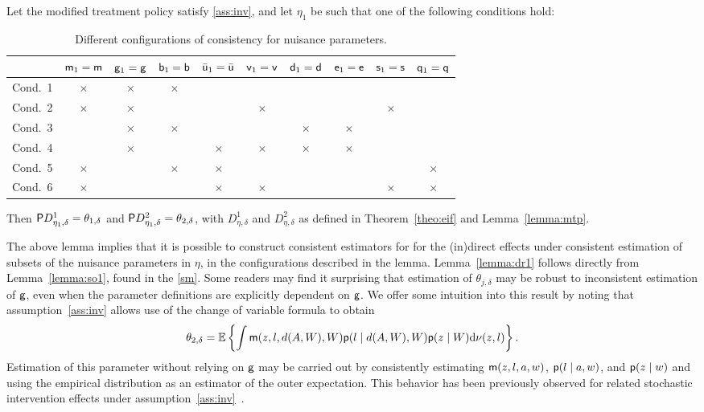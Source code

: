 \begin{lemma}\label{lemma:dr1}
  Let the modified treatment policy satisfy \ref{ass:inv}, and let $\eta_1$ be
  such that one of the following conditions hold:
  \begin{table}[H]
    \centering
    \begin{tabular}{|c|c|c|c|c|c|c|c|c|c|}\hline
              & $\m_1=\m$ & $\g_1=\g$ & $\b_1=\b$ & $\bar\uu_1=\bar\uu$ & $\vv_1=\vv$ & $\d_1=\d$ & $\e_1=\e$ & $\s_1=\s$ & $\q_1=\q$ \\\hline
      Cond.~1 & $\times$  & $\times$  & $\times$  &                     &             &           &           &           &           \\
      Cond.~2 & $\times$  & $\times$  &           &                     & $\times$    &           &           & $\times$  &           \\
      Cond.~3 &           & $\times$  & $\times$  &                     &             & $\times$  & $\times$  &           &           \\
      Cond.~4 &           & $\times$  &           & $\times$            & $\times$    & $\times$  & $\times$  &           &           \\
      Cond.~5 & $\times$  &           & $\times$  & $\times$            &             &           &           &           & $\times$  \\
      Cond.~6 & $\times$  &           &           & $\times$            & $\times$    &           &           & $\times$  & $\times$  \\\hline
    \end{tabular}
    \caption{Different configurations of consistency for nuisance
      parameters.}
    \label{tab:dr1}
  \end{table}
  Then $\P D_{\eta_1,\delta}^1=\theta_{1,\delta}$ and $\P
  D_{\eta_1,\delta}^2=\theta_{2,\delta}$, with $D_{\eta,\delta}^1$ and
  $D_{\eta,\delta}^2$ as defined in Theorem~\ref{theo:eif} and
  Lemma~\ref{lemma:mtp}.
\end{lemma}
The above lemma implies that it is possible to construct consistent estimators
for for the (in)direct effects under consistent estimation of subsets of the
nuisance parameters in $\eta$, in the configurations described in the lemma.
Lemma~\ref{lemma:dr1} follows directly from Lemma~\ref{lemma:so1}, found in
the \ref{sm}. Some readers may find it surprising that estimation of
$\theta_{j,\delta}$ may be robust to inconsistent estimation of $\g$, even when
the parameter definitions are explicitly dependent on $\g$. We offer some
intuition into this result by noting that assumption~\ref{ass:inv} allows use of
the change of variable formula to obtain $$\theta_{2,\delta} = \E\left\{\int
\m(z, l, d(A,W),W)\p(l\mid d(A,W), W)\p(z \mid W)\dd\nu(z,l)\right\}.$$
Estimation of this parameter without relying on $\g$ may be carried out by
consistently estimating $\m(z,l,a,w)$, $\p(l\mid a, w)$, and $\p(z\mid w)$ and
using the empirical distribution as an estimator of the outer expectation. This
behavior has been previously observed for related stochastic intervention
effects under assumption~\ref{ass:inv}~\citep{diaz2012population,
haneuse2013estimation, diaz2020causal}.

